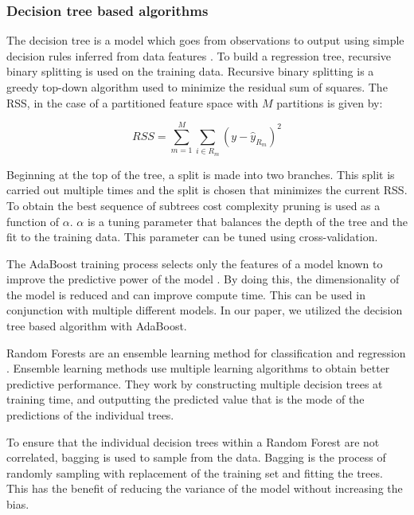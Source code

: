 \documentclass[final,3p,times,twocolumn,numbers]{elsarticle}
\begin{document}
%



\subsubsection{Decision tree based algorithms}

The decision tree is a model which goes from observations to output using simple decision rules inferred from data features \cite{Quinlan}. To build a regression tree, recursive binary splitting is used on the training data. Recursive binary splitting is a greedy top-down algorithm used to minimize the residual sum of squares. The RSS, in the case of a partitioned feature space with $M$ partitions is given by:

\begin{equation}
	RSS=\sum^M_{m=1}\sum_{i\in R_m}(y-\hat{y}_{R_m})^2
\end{equation}

Beginning at the top of the tree, a split is made into two branches. This split is carried out multiple times and the split is chosen that minimizes the current RSS. To obtain the best sequence of subtrees cost complexity pruning is used as a function of $\alpha$. $\alpha$ is a tuning parameter that balances the depth of the tree and the fit to the training data. This parameter can be tuned using cross-validation.


The AdaBoost training process selects only the features of a model known to improve the predictive power of the model \cite{Freund1997}. By doing this, the dimensionality of the model is reduced and can improve compute time. This can be used in conjunction with multiple different models. In our paper, we utilized the decision tree based algorithm with AdaBoost.


Random Forests are an ensemble learning method for classification and regression \cite{Breiman2001}. Ensemble learning methods use multiple learning algorithms to obtain better predictive performance. They work by constructing multiple decision trees at training time, and outputting the predicted value that is the mode of the predictions of the individual trees.

To ensure that the individual decision trees within a Random Forest are not correlated, bagging is used to sample from the data. Bagging is the process of randomly sampling with replacement of the training set and fitting the trees. This has the benefit of reducing the variance of the model without increasing the bias. 
\end{document}
